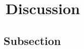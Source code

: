 \graphicspath{{images/}}

\section{\thesection~Discussion}
\label{sec:discussion}

\subsection{\thesubsection~Subsection}


